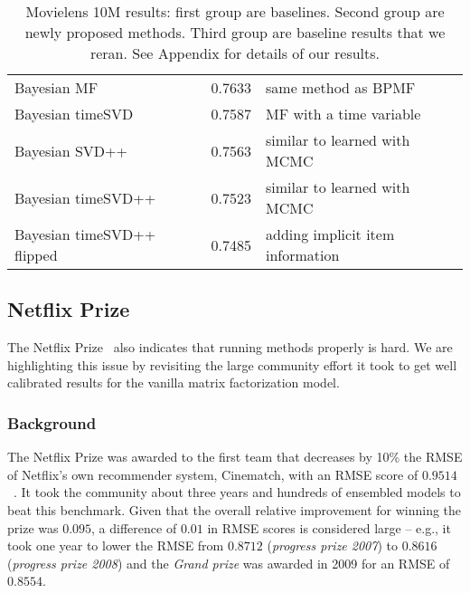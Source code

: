 \documentclass{article}
\newcommand\rmsebfmui{0.7633}
\newcommand\rmsebfmuit{0.7587}
\newcommand\rmsebfmuiui{0.7563}
\newcommand\rmsebfmuitui{0.7523}
\newcommand\rmsebfmuituiiu{0.7485}
\begin{document}
\begin{table}[h]
\begin{tabular}{lSl}
Bayesian MF~\cite{salakhutdinov:icml08,freudenthaler:nipsws11} & \rmsebfmui & same method as BPMF\\
Bayesian timeSVD~\cite{koren:kdd09,freudenthaler:nipsws11,rendle:vldb13} & \rmsebfmuit & MF with a time variable \\
Bayesian SVD++~\cite{koren:kdd08,rendle:vldb13} & \rmsebfmuiui & similar to \cite{koren:kdd08} learned with MCMC\\
Bayesian timeSVD++~\cite{koren:kdd09,rendle:vldb13} & \rmsebfmuitui & similar to \cite{koren:kdd09} learned with MCMC \\
Bayesian timeSVD++ flipped~\cite{rendle:vldb13} & \rmsebfmuituiiu & adding implicit item information \\
\bottomrule
\end{tabular}
    \caption{Movielens 10M results: first group are baselines. Second group are newly proposed methods. Third group are baseline results that we reran. See Appendix for details of our results.
    \label{tbl:ml10m}}
\end{table}

\pagebreak[4]


\subsection{Netflix Prize}
\label{sec:netflix}

The Netflix Prize~\cite{bennett:kddcup07} also indicates that running methods properly is hard.
We are highlighting this issue by revisiting the large community effort it took to get well calibrated results for the vanilla matrix factorization model.

\subsubsection{Background}


The Netflix Prize was awarded to the first team that decreases by 10\% the RMSE of Netflix's own recommender system, Cinematch, with an RMSE score of $0.9514$~\cite{bennett:kddcup07}.
It took the community about three years and hundreds of ensembled models to beat this benchmark.
Given that the overall relative improvement for winning the prize was $0.095$, a difference of $0.01$ in RMSE scores is considered large -- e.g., it took one year to lower the RMSE from $0.8712$ (\emph{progress prize 2007}) to $0.8616$ (\emph{progress prize 2008}) and the \emph{Grand prize} was awarded in 2009 for an RMSE of $0.8554$.
\end{document}
